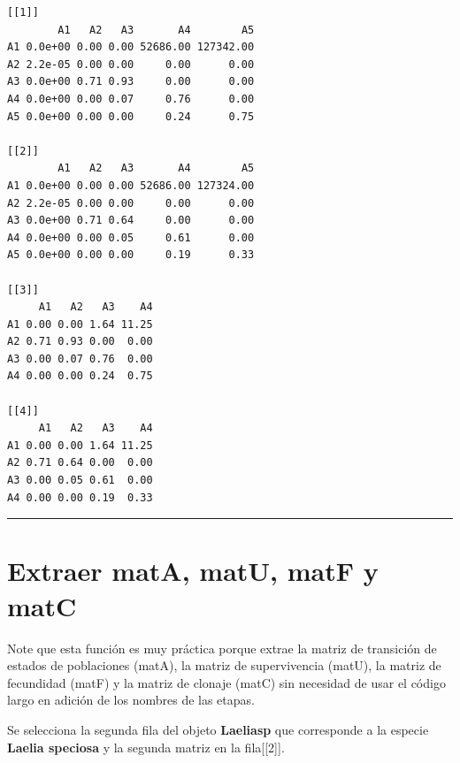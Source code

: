 \documentclass[
  12pt,
  letterpaper,
]{book}
\newenvironment{Shaded}{\begin{snugshade}}{\end{snugshade}}
\newcommand{\DecValTok}[1]{\textcolor[rgb]{0.68,0.00,0.00}{#1}}
\newcommand{\NormalTok}[1]{\textcolor[rgb]{0.00,0.23,0.31}{#1}}
\newcommand{\SpecialCharTok}[1]{\textcolor[rgb]{0.37,0.37,0.37}{#1}}
\begin{document}
\begin{verbatim}
[[1]]
        A1   A2   A3       A4        A5
A1 0.0e+00 0.00 0.00 52686.00 127342.00
A2 2.2e-05 0.00 0.00     0.00      0.00
A3 0.0e+00 0.71 0.93     0.00      0.00
A4 0.0e+00 0.00 0.07     0.76      0.00
A5 0.0e+00 0.00 0.00     0.24      0.75

[[2]]
        A1   A2   A3       A4        A5
A1 0.0e+00 0.00 0.00 52686.00 127324.00
A2 2.2e-05 0.00 0.00     0.00      0.00
A3 0.0e+00 0.71 0.64     0.00      0.00
A4 0.0e+00 0.00 0.05     0.61      0.00
A5 0.0e+00 0.00 0.00     0.19      0.33

[[3]]
     A1   A2   A3    A4
A1 0.00 0.00 1.64 11.25
A2 0.71 0.93 0.00  0.00
A3 0.00 0.07 0.76  0.00
A4 0.00 0.00 0.24  0.75

[[4]]
     A1   A2   A3    A4
A1 0.00 0.00 1.64 11.25
A2 0.71 0.64 0.00  0.00
A3 0.00 0.05 0.61  0.00
A4 0.00 0.00 0.19  0.33
\end{verbatim}

\begin{center}\rule{0.5\linewidth}{0.5pt}\end{center}

\section{Extraer matA, matU, matF y
matC}\label{extraer-mata-matu-matf-y-matc}

Note que esta función es muy práctica porque extrae la matriz de
transición de estados de poblaciones (matA), la matriz de supervivencia
(matU), la matriz de fecundidad (matF) y la matriz de clonaje (matC) sin
necesidad de usar el código largo en adición de los nombres de las
etapas.

Se selecciona la segunda fila del objeto \textbf{Laeliasp} que
corresponde a la especie \textbf{Laelia speciosa} y la segunda matriz en
la fila{[}{[}2{]}{]}.

\begin{Shaded}
\end{Shaded}
\end{document}
